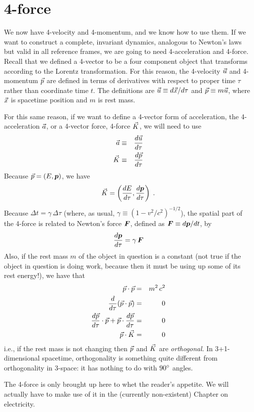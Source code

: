 \section{4-force}
\label{sec:4-force}

We now have 4-velocity and 4-momentum, and we know how to use them.
If we want to construct a complete, invariant dynamics, analogous to
Newton's laws but valid in all reference frames, we are going to need
4-acceleration and 4-force.  Recall that we defined a 4-vector to be a
four component object that transforms according to the Lorentz
transformation.  For this reason, the 4-velocity $\vec{u}$ and
4-momentum $\vec{p}$ are defined in terms of derivatives with respect
to proper time $\tau$ rather than coordinate time $t$.  The
definitions are $\vec{u}\equiv d\vec{x}/d\tau$ and $\vec{p}\equiv
m\vec{u}$, where $\vec{x}$ is spacetime position and $m$ is rest mass.

For this same reason, if we want to define a 4-vector form of
acceleration, the 4-acceleration $\vec{a}$, or a 4-vector force,
4-force $\vec{K}$, we will need to use
\begin{eqnarray}
\vec{a} & \equiv & \frac{d\vec{u}}{d\tau} \\
\vec{K} & \equiv & \frac{d\vec{p}}{d\tau}
\end{eqnarray}
Because $\vec{p}=(E,\mbox{\boldmath $p$})$, we have
\begin{equation}
\vec{K} = \left(\frac{dE}{d\tau},\frac{d\mbox{\boldmath $p$}}{d\tau}\right) \; .
\end{equation}
Because $\Delta t=\gamma\,\Delta\tau$ (where, as usual, $\gamma\equiv
(1-v^2/c^2)^{-1/2}$), the spatial part of the 4-force is related to
Newton's force $\mbox{\boldmath $F$}$, defined as $\mbox{\boldmath $F$}\equiv d\mbox{\boldmath $p$}/dt$, by
\begin{equation}
\frac{d\mbox{\boldmath $p$}}{d\tau} = \gamma\,\mbox{\boldmath $F$}
\end{equation}
Also, if the rest mass $m$ of the object in question is a constant
(not true if the object in question is doing work, because then it
must be using up some of its rest energy!), we have that
\begin{eqnarray}
\vec{p}\cdot\vec{p} & = & m^2\,c^2\nonumber\\
\frac{d}{d\tau}(\vec{p}\cdot\vec{p}) & = & 0\nonumber\\
\frac{d\vec{p}}{d\tau}\cdot\vec{p} + \vec{p}\cdot\frac{d\vec{p}}{d\tau}
 & = & 0\nonumber\\
\vec{p}\cdot\vec{K} & = & 0
\end{eqnarray}
i.e., if the rest mass is not changing then $\vec{p}$ and $\vec{K}$ are
{\em orthogonal.\/}  In 3+1-dimensional spacetime, orthogonality is
something quite different from orthogonality in 3-space: it has
nothing to do with $90^{\circ}$ angles.

The 4-force is only brought up here to whet the reader's appetite.  We
will actually have to make use of it in the (currently non-existent)
Chapter on electricity.

